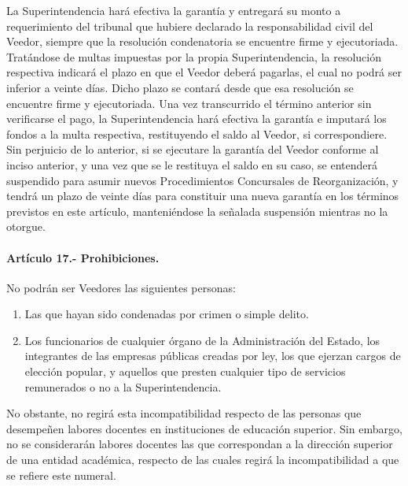 \documentclass[
]{book}
\begin{document}
La Superintendencia hará efectiva la garantía y entregará su monto a requerimiento del tribunal que hubiere declarado la responsabilidad civil del Veedor, siempre que la resolución condenatoria se encuentre firme y ejecutoriada. Tratándose de multas impuestas por la propia Superintendencia, la resolución respectiva indicará el plazo en que el Veedor deberá pagarlas, el cual no podrá ser inferior a veinte días. Dicho plazo se contará desde que esa resolución se encuentre firme y ejecutoriada. Una vez transcurrido el término anterior sin verificarse el pago, la Superintendencia hará efectiva la garantía e imputará los fondos a la multa respectiva, restituyendo el saldo al Veedor, si correspondiere.
Sin perjuicio de lo anterior, si se ejecutare la garantía del Veedor conforme al inciso anterior, y una vez que se le restituya el saldo en su caso, se entenderá suspendido para asumir nuevos Procedimientos Concursales de Reorganización, y tendrá un plazo de veinte días para constituir una nueva garantía en los términos previstos en este artículo, manteniéndose la señalada suspensión mientras no la otorgue.

\hypertarget{artuxedculo-17.--prohibiciones.}{%
\paragraph*{Artículo 17.- Prohibiciones.}\label{artuxedculo-17.--prohibiciones.}}

No podrán ser Veedores las siguientes personas:

\begin{enumerate}
\def\labelenumi{\arabic{enumi})}
\item
  Las que hayan sido condenadas por crimen o simple delito.
\item
  Los funcionarios de cualquier órgano de la Administración del Estado, los integrantes de las empresas públicas creadas por ley, los que ejerzan cargos de elección popular, y aquellos que presten cualquier tipo de servicios remunerados o no a la Superintendencia.
\end{enumerate}

No obstante, no regirá esta incompatibilidad respecto de las personas que desempeñen labores docentes en instituciones de educación superior. Sin embargo, no se considerarán labores docentes las que correspondan a la dirección superior de una entidad académica, respecto de las cuales regirá la incompatibilidad a que se refiere este numeral.
\end{document}
